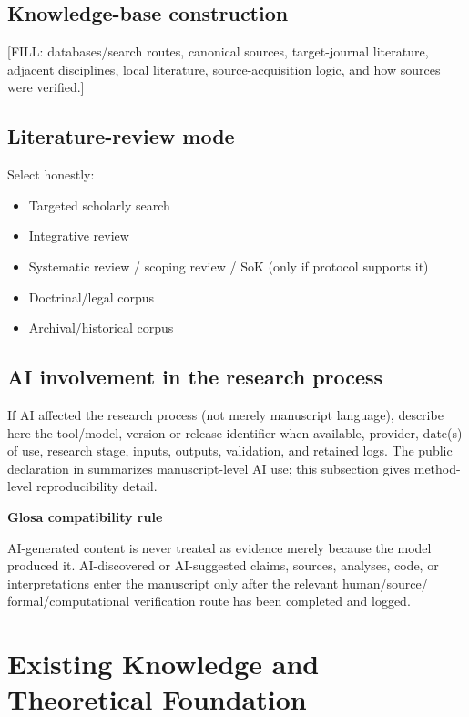\documentclass[11pt]{article}
\newenvironment{schemaBox}[1]
  {\begin{center}\begin{minipage}{0.96\linewidth}\small
   \noindent\textbf{#1}\par\medskip}
  {\end{minipage}\end{center}}
\begin{document}
\subsection{Knowledge-base construction}
[FILL: databases/search routes, canonical sources, target-journal literature,
adjacent disciplines, local literature, source-acquisition logic, and how
sources were verified.]

\subsection{Literature-review mode}
\label{sec:lrs-mode}
Select honestly:
\begin{itemize}
  \item [FILL] Targeted scholarly search
  \item [FILL] Integrative review
  \item [FILL] Systematic review / scoping review / SoK (only if protocol supports it)
  \item [FILL] Doctrinal/legal corpus
  \item [FILL] Archival/historical corpus
\end{itemize}

\subsection{AI involvement in the research process}
\label{sec:ai-method}
If AI affected the research process (not merely manuscript language), describe
here the tool/model, version or release identifier when available, provider,
date(s) of use, research stage, inputs, outputs, validation, and retained logs.
The public declaration in  summarizes manuscript-level
AI use; this subsection gives method-level reproducibility detail.

\begin{schemaBox}{Glosa compatibility rule}
AI-generated content is never treated as evidence merely because the model
produced it. AI-discovered or AI-suggested claims, sources, analyses, code, or
interpretations enter the manuscript only after the relevant human/source/
formal/computational verification route has been completed and logged.
\end{schemaBox}


\section{Existing Knowledge and Theoretical Foundation}
\label{sec:s3}
\end{document}
